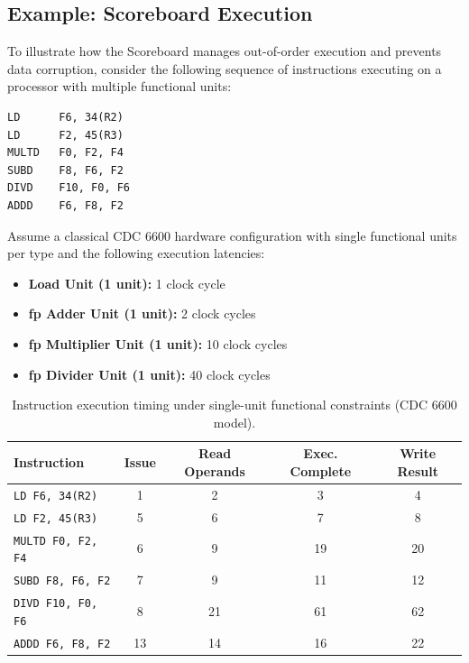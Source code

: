 \subsection{Example: Scoreboard Execution}

To illustrate how the Scoreboard manages out-of-order execution and prevents data corruption, consider the following sequence of instructions executing on a processor with multiple functional units:

\begin{lstlisting}[language={[x86masm]Assembler}]
LD      F6, 34(R2)
LD      F2, 45(R3)
MULTD   F0, F2, F4
SUBD    F8, F6, F2
DIVD    F10, F0, F6
ADDD    F6, F8, F2
\end{lstlisting}

Assume a classical CDC 6600 hardware configuration with single functional units per type and the following execution latencies:
\begin{itemize}
    \item \textbf{Load Unit (1 unit):} 1 clock cycle
    \item \textbf{\gls{fp} Adder Unit (1 unit):} 2 clock cycles
    \item \textbf{\gls{fp} Multiplier Unit (1 unit):} 10 clock cycles
    \item \textbf{\gls{fp} Divider Unit (1 unit):} 40 clock cycles
\end{itemize}

\begin{table}[htpb]
    \centering
    \renewcommand{\arraystretch}{1.2}
    \begin{tabular}{l c c c c}
        \textbf{Instruction} & \textbf{Issue} & \textbf{Read Operands} & \textbf{Exec. Complete} & \textbf{Write Result} \\
        \hline
        \texttt{LD   F6, 34(R2)}  & 1  & 2  & 3  & 4  \\
        \texttt{LD   F2, 45(R3)}  & 5  & 6  & 7  & 8  \\
        \texttt{MULTD F0, F2, F4} & 6  & 9  & 19 & 20 \\
        \texttt{SUBD  F8, F6, F2} & 7  & 9  & 11 & 12 \\
        \texttt{DIVD  F10, F0, F6}& 8  & 21 & 61 & 62 \\
        \texttt{ADDD  F6, F8, F2} & 13 & 14 & 16 & 22 \\
        \hline
    \end{tabular}
    \caption{Instruction execution timing under single-unit functional constraints (CDC 6600 model).}
    \label{tab:scoreboard-timing}
\end{table}

